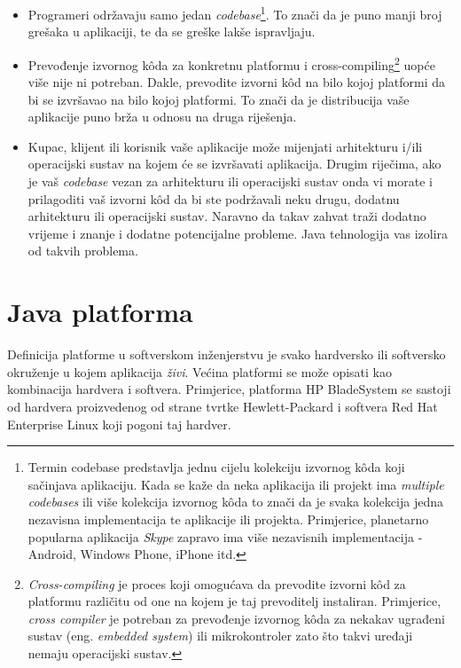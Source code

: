 \begin{itemize}
    \item Programeri održavaju samo jedan \emph{codebase}\footnote{Termin codebase predstavlja jednu cijelu kolekciju izvornog kôda koji sačinjava aplikaciju. Kada se kaže da neka aplikacija ili projekt ima \emph{multiple codebases} ili više kolekcija izvornog kôda to znači da je svaka kolekcija jedna nezavisna implementacija te aplikacije ili projekta. Primjerice, planetarno popularna aplikacija \emph{Skype} zapravo ima više nezavisnih implementacija - Android, Windows Phone, iPhone itd.}. To znači da je puno manji broj grešaka u aplikaciji, te da se greške lakše ispravljaju.
    
    \item Prevođenje izvornog kôda za konkretnu platformu i cross-compiling\footnote{\emph{Cross-compiling} je proces koji omogućava da prevodite izvorni kôd za platformu različitu od one na kojem je taj prevoditelj instaliran. Primjerice, \emph{cross compiler} je potreban za prevođenje izvornog kôda za nekakav ugrađeni sustav (eng. \emph{embedded system}) ili mikrokontroler zato što takvi uređaji nemaju operacijski sustav.} uopće više nije ni potreban. Dakle, prevodite izvorni kôd na bilo kojoj platformi da bi se izvršavao na bilo kojoj platformi. To znači da je distribucija vaše aplikacije puno brža u odnosu na druga riješenja.
    
    \item Kupac, klijent ili korisnik vaše aplikacije može mijenjati arhitekturu i/ili operacijski sustav na kojem će se izvršavati aplikacija. Drugim riječima, ako je vaš \emph{codebase} vezan za arhitekturu ili operacijski sustav onda vi morate i prilagoditi vaš izvorni kôd da bi ste podržavali neku drugu, dodatnu arhitekturu ili operacijski sustav. Naravno da takav zahvat traži dodatno vrijeme i znanje i dodatne potencijalne probleme. Java tehnologija vas izolira od takvih problema.
\end{itemize}

\section{Java platforma}
Definicija platforme u softverskom inženjerstvu je svako hardversko ili softversko okruženje u kojem aplikacija \emph{živi}. Većina platformi se može opisati kao kombinacija hardvera i softvera. Primjerice, platforma HP BladeSystem se sastoji od hardvera proizvedenog od strane tvrtke Hewlett-Packard i softvera Red Hat Enterprise Linux koji pogoni taj hardver.

